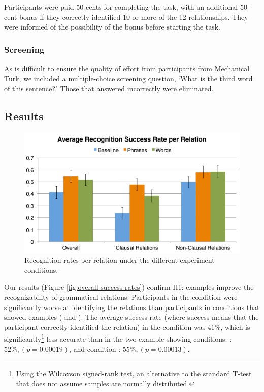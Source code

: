 Participants were paid 50 cents for completing the task, with an additional 50-cent bonus if they correctly identified 10 or more of the 12 relationships. They were informed of the possibility of the bonus before starting the task.

\subsubsection{Screening}

As is difficult to ensure the quality of effort from participants from Mechanical Turk, we included a multiple-choice screening question, `What is the third word of this sentence?"  Those that answered incorrectly were eliminated.


\subsection{Results}
\begin{figure}
\centering
\includegraphics[width=\columnwidth]{fig/results}
\caption{\label{fig:results}Recognition rates per relation under the different experiment conditions.}
\end{figure}
Our results (Figure \ref{fig:overall-success-rates}) confirm H1: examples improve the recognizability of grammatical relations. Participants in the  condition were significantly worse at identifying the relations than participants in conditions that showed examples ( and ).  The average success rate (where success means that the participant correctly identified the relation) in the  condition was $41\%$, which is significantly\footnote{Using the Wilcoxson signed-rank test, an alternative to the standard T-test that does not assume samples are normally distributed.} less accurate than in the two example-showing conditions: : $52\%, (p = 0.00019)$, and  condition : $55\%, (p = 0.00013)$.

